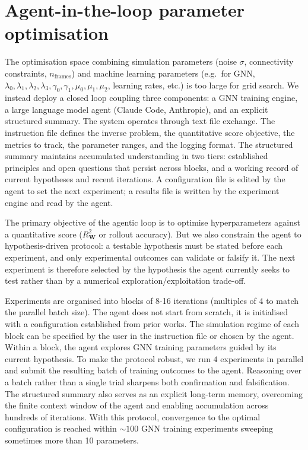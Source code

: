 \documentclass{article}
\begin{document}



\newpage
\section{Agent-in-the-loop parameter optimisation}
\label{app:agent}

The optimisation space combining simulation parameters (noise $\sigma$,
connectivity constraints, $n_{\mathrm{frames}}$) and machine learning parameters
(e.g.\ for GNN, $\lambda_0,\lambda_1,\lambda_2,\lambda_3,\gamma_0,\gamma_1,\mu_0,\mu_1,\mu_2$, learning rates, etc.) is too large for grid search. We instead deploy a closed loop
coupling three components: a GNN training engine, a large language model
agent (Claude Code, Anthropic), and an explicit structured summary. The system
operates through text file exchange. The instruction file defines the inverse
problem, the quantitative score objective, the metrics to track, the parameter
ranges, and the logging format. The structured summary maintains accumulated
understanding in two tiers: established principles and open questions that
persist across blocks, and a working record of current hypotheses and recent
iterations. A configuration file is edited by the agent to set the next
experiment; a results file is written by the experiment engine and read by
the agent.

The primary objective of the agentic loop is to optimise hyperparameters
against a quantitative score ($R^2_{\mathbf{W}}$ or rollout accuracy). But we
also constrain the agent to hypothesis-driven protocol: a testable
hypothesis must be stated before each experiment, and only experimental
outcomes can validate or falsify it. The next experiment is therefore
selected by the hypothesis the agent currently seeks to test rather than by a
numerical exploration/exploitation trade-off.

Experiments are organised into blocks of 8-16 iterations (multiples of 4 to
match the parallel batch size). The agent does not start from scratch, it is initialised with a configuration established from prior works. The simulation
regime of each block can be specified by the user in the instruction file or
chosen by the agent. Within a block, the agent explores GNN training
parameters guided by its current hypothesis. To make the protocol robust, we
run $4$ experiments in parallel and submit the resulting batch of training
outcomes to the agent. Reasoning over a batch rather than a single trial
sharpens both confirmation and falsification. The structured summary also
serves as an explicit long-term memory, overcoming the finite context window
of the agent and enabling accumulation across hundreds of iterations. With
this protocol, convergence to the optimal configuration is reached within
$\sim 100$ GNN training experiments sweeping sometimes more than 10 parameters.
\end{document}
